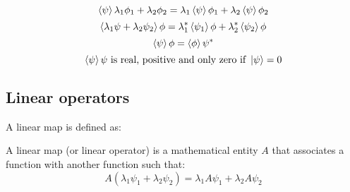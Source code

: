\begin{equation}
    \braket{\psi}{\lambda_1\phi_1+\lambda_2\phi_2} = \lambda_1\braket{\psi}{\phi_1} + \lambda_2\braket{\psi}{\phi_2}
\end{equation}
\begin{equation}
    \braket{\lambda_1\psi+\lambda_2\psi_2}{\phi} = \lambda_1^*\braket{\psi_1}{\phi} + \lambda_2^*\braket{\psi_2}{\phi}
\end{equation}
\begin{equation}
    \braket{\psi}{\phi} = \braket{\phi}{\psi}^*
\end{equation}
\begin{equation}
    \braket{\psi}{\psi}\text{ is real, positive and only zero if }\ket{\psi} = 0
\end{equation}


\subsection{Linear operators}

A linear map is defined as:

\begin{definition} \label{linear_map}
    A linear map (or linear operator) is a mathematical entity $A$ that associates a function with another function such that:
    \begin{equation}
        A (\lambda_1\psi_1 + \lambda_2\psi_2) = \lambda_1 A\psi_1 + \lambda_2 A\psi_2
    \end{equation}
\end{definition}


